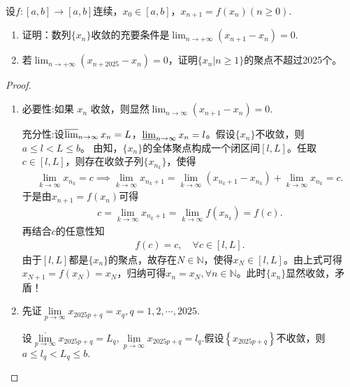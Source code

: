 \documentclass[../../main.tex]{subfiles}
\begin{document}
\begin{example}
设\( f: [a,b] \to [a,b] \)连续，\( x_0 \in [a,b] \)，\( x_{n+1} = f(x_n) (n \geqslant 0) \).
\begin{enumerate}
\item 证明：数列\( \{x_n\} \)收敛的充要条件是\( \lim_{n \to +\infty} (x_{n+1} - x_n) = 0 \).

\item 若\( \lim_{n \to +\infty} (x_{n+2025} - x_n) = 0 \)，证明\( \{x_n | n \geqslant 1\} \)的聚点不超过2025个。
\end{enumerate}
\end{example}
\begin{proof}
\begin{enumerate}
\item {\heiti 必要性:}如果 \( x_{n} \) 收敛，则显然$\lim _{n \to \infty } ( x_{n+1}-x_{n})=0$.

{\heiti 充分性:}设\( \varlimsup_{n \to \infty} x_n = L \)，\( \varliminf_{n \to \infty} x_n = l \)。假设\( \{x_n\} \)不收敛，则\( a \leqslant l < L \leqslant b \)。
由知，\( \{x_n\} \)的全体聚点构成一个闭区间\( [l, L] \)。任取\( c \in [l, L] \)，则存在收敛子列\( \{x_{n_k}\} \)，使得
\begin{align*}
\lim_{k \to \infty} x_{n_k} = c \implies \lim_{k \to \infty} x_{n_k + 1} = \lim_{k \to \infty} (x_{n_k + 1} - x_{n_k}) + \lim_{k \to \infty} x_{n_k} = c.
\end{align*}
于是由\( x_{n+1} = f(x_n) \)可得
\begin{align*}
c = \lim_{k \to \infty} x_{n_k + 1} = \lim_{k \to \infty} f(x_{n_k}) = f(c).
\end{align*}
再结合\( c \)的任意性知
\begin{align*}
f(c) = c, \quad \forall c \in [l, L].
\end{align*}
由于\( [l, L] \)都是\( \{x_n\} \)的聚点，故存在\( N \in \mathbb{N} \)，使得\( x_N \in [l, L] \)。由上式可得\( x_{N+1} = f(x_N) = x_N \)，归纳可得\( x_n = x_N, \forall n \in \mathbb{N} \)。此时\( \{x_n\} \)显然收敛，矛盾！

\item 先证$\underset{p\rightarrow \infty}{\lim}x_{2025p+q}=x_q,q=1,2,\cdots ,2025.$

设$\underset{p\rightarrow \infty}{\overline{\lim }}x_{2025p+q}=L_q,\underset{p\rightarrow \infty}{\underline{\lim }}x_{2025p+q}=l_q.$假设$\left\{ x_{2025p+q} \right\}$不收敛，则$a\leqslant l_q<L_q\leqslant b.$


\end{enumerate}
\end{proof}
\end{document}
